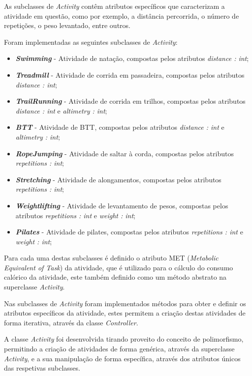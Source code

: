 \documentclass[a4paper,12pt]{scrreprt}
\begin{document}
    As subclasses de \textit{Activity} contêm atributos específicos que caracterizam a atividade em questão,
    como por exemplo, a distância percorrida, o número de repetições, o peso levantado, entre outros.

    Foram implementadas as seguintes subclasses de \textit{Activity}:
    \begin{itemize}
        \item \textit{\textbf{Swimming}} - Atividade de natação, compostas pelos atributos \textit{distance : int};
        \item \textit{\textbf{Treadmill}} - Atividade de corrida em passadeira, compostas pelos atributos \textit{distance : int};
        \item \textit{\textbf{TrailRunning}} - Atividade de corrida em trilhos, compostas pelos atributos \textit{distance : int} e \textit{altimetry : int};
        \item \textit{\textbf{BTT}} - Atividade de BTT, compostas pelos atributos \textit{distance : int} e \textit{altimetry : int};
        \item \textit{\textbf{RopeJumping}} - Atividade de saltar à corda, compostas pelos atributos \textit{repetitions : int};
        \item \textit{\textbf{Stretching}} - Atividade de alongamentos, compostas pelos atributos \textit{repetitions : int};
        \item \textit{\textbf{Weightlifting}} - Atividade de levantamento de pesos, compostas pelos atributos \textit{repetitions : int} e \textit{weight : int};
        \item \textit{\textbf{Pilates}} - Atividade de pilates, compostas pelos atributos \textit{repetitions : int} e \textit{weight : int};
    \end{itemize}

    Para cada uma destas subclasses é definido o atributo MET (\textit{Metabolic Equivalent of Task}) da atividade,
    que é utilizado para o cálculo do consumo calórico da atividade,
    este também definido como um método abstrato na superclasse \textit{Activity}.

    Nas subclasses de \textit{Activity} foram implementados métodos para obter e definir os atributos específicos da atividade,
    estes permitem a criação destas atividades de forma iterativa, através da classe \textit{Controller}.

    A classe \textit{Activity} foi desenvolvida tirando proveito do conceito de polimorfismo,
    permitindo a criação de atividades de forma genérica, através da superclasse \textit{Activity},
    e a sua manipulação de forma específica, através dos atributos únicos das respetivas subclasses.
\end{document}
